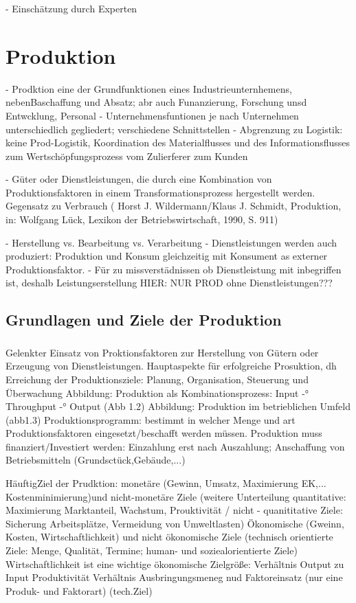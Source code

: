 \documentclass[a4paper,12pt, german]{report}
\begin{document}
- Einschätzung durch Experten

\section{Produktion}

- Prodktion eine der Grundfunktionen eines Industrieunternhemens, nebenBaschaffung und Absatz; abr auch Funanzierung, Forschung unsd Entwcklung, Personal 
- Unternehmensfuntionen je nach Unternehmen unterschiedlich gegliedert; verschiedene Schnittstellen
- Abgrenzung zu Logistik: keine Prod-Logistik, Koordination des Materialflusses und des Informationsflusses zum Wertschöpfungsprozess vom Zulierferer zum Kunden
\cite{07}

- Güter oder Dienstleistungen, die durch eine Kombination von Produktionsfaktoren in einem Transformationsprozess hergestellt werden. Gegensatz zu Verbrauch ( Horst J. Wildermann/Klaus J. Schmidt, Produktion, in: Wolfgang Lück, Lexikon der Betriebswirtschaft, 1990, S. 911)

- Herstellung vs. Bearbeitung vs. Verarbeitung
- Dienstleistungen werden auch produziert: Produktion und Konsum gleichzeitig mit Konsument as externer Produktionsfaktor. 
- Für zu missverstädnissen ob Dienstleistung mit inbegriffen ist, deshalb Leistungserstellung
HIER: NUR PROD ohne Dienstleistungen???

\subsection{Grundlagen und Ziele der Produktion}

\subsubsection{}
Gelenkter Einsatz von Proktionsfaktoren zur Herstellung von Gütern oder Erzeugung von Dienstleistungen. Hauptaspekte für erfolgreiche Prosuktion, dh Erreichung der Produktionsziele: Planung, Organisation, Steuerung und Überwachung 
Abbildung: Produktion als Kombinationsprozess: Input -° Throughput -° Output (Abb 1.2)
Abbildung: Produktion im betrieblichen Umfeld (abb1.3)
Produktionsprogramm: bestimmt in welcher Menge und art Produktionsfaktoren eingesetzt/beschafft werden müssen.
Produktion muss finanziert/Investiert werden: Einzahlung erst nach Auszahlung; Anschaffung von Betriebsmitteln (Grundsctück,Gebäude,...)
\cite{07}

HäuftigZiel der Prudktion: monetäre (Gewinn, Umsatz, Maximierung EK,... Kostenminimierung)und nicht-monetäre Ziele (weitere Unterteilung quantitative: Maximierung Marktanteil, Wachstum, Prouktivität / nicht - quanititative Ziele: Sicherung Arbeitsplätze, Vermeidung von Umweltlasten) 
Ökonomische (Gweinn, Kosten, Wirtschaftlichkeit) und nicht ökonomische Ziele (technisch orientierte Ziele: Menge, Qualität, Termine; human- und soziealorientierte Ziele)
Wirtschaftlichkeit ist eine wichtige ökonomische Zielgröße: Verhältnis Output zu Input
Produktivität Verhältnis Ausbringungsmeneg nud Faktoreinsatz (nur eine Produk- und Faktorart) (tech.Ziel)
\end{document}
